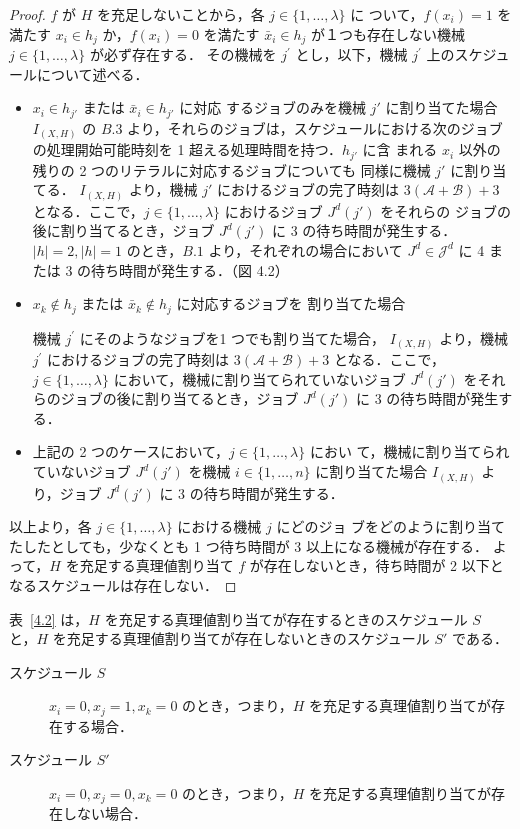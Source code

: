 \documentclass[12pt]{optlab-bachelor}
\begin{document}
\begin{proof}
  $f$ が $H$ を充足しないことから，各 $j \in \{1, \ldots, \lambda \}$ に
  ついて，$f(x_i) = 1$ を満たす $x_i \in h_j$ か，$f(x_i) = 0$ を満たす
  $\bar x_i \in h_j$ が１つも存在しない機械 $j \in \{1,\ldots, \lambda\}$ が必ず存在する．
  その機械を $j^{\prime}$ とし，以下，機械 $j^{\prime}$ 上のスケジュールについて述べる．
  \begin{itemize}
    \item $x_i \in h_{j'}$ または $\bar x_i \in h_{j'}$ に対応
    するジョブのみを機械 $j'$ に割り当てた場合
    $I_{(X,H)}$ の $B.3$ より，それらのジョブは，スケジュールにおける次のジョブの処理開始可能時刻を 1 超える処理時間を持つ．$h_{j'}$ に含
    まれる $x_i$ 以外の残りの 2 つのリテラルに対応するジョブについても
    同様に機械 $j'$ に割り当てる．
    $I_{(X,H)}$ より，機械 $j'$ におけるジョブの完了時刻は
    $3(\mathcal{A} + \mathcal{B}) + 3$ となる．ここで，$j \in
    \{1,\ldots,\lambda\}$ におけるジョブ $J^d(j')$ をそれらの
    ジョブの後に割り当てるとき，ジョブ $J^d(j')$ に 3 の待ち時間が発生する．$|h| = 2,|h| = 1$ のとき，$B.1$ より，それぞれの場合において $J^d \in \mathcal{J}^d$ に 4 または 3 の待ち時間が発生する．（図 4.2）
  \end{itemize}

  \begin{itemize}
    \item $x_k \notin h_j$ または $\bar x_k \notin h_j$ に対応するジョブを
    割り当てた場合

    機械 $j^{\prime}$ にそのようなジョブを1 つでも割り当てた場合，
    $I_{(X,H)}$ より，機械 $j^{\prime}$ におけるジョブの完了時刻は
    $3(\mathcal{A} + \mathcal{B}) + 3$ となる．ここで，$j \in
    \{1,\ldots,\lambda\}$ において，機械に割り当てられていないジョブ
    $J^d(j')$ をそれらのジョブの後に割り当てるとき，ジョブ
    $J^d(j')$ に 3 の待ち時間が発生する．
    \item 上記の 2 つのケースにおいて，$j \in \{1,\ldots,\lambda\}$ におい
    て，機械に割り当てられていないジョブ $J^d(j')$ を機械 $i
    \in \{1,\ldots,n\}$ に割り当てた場合 $I_{(X,H)}$ より，ジョブ
    $J^d(j')$ に 3 の待ち時間が発生する．
  \end{itemize}
  以上より，各 $j \in \{1,\ldots,\lambda\}$ における機械 $j$ にどのジョ
  ブをどのように割り当てたしたとしても，少なくとも 1 つ待ち時間が 3 以上になる機械が存在する．
  よって，$H$ を充足する真理値割り当て $f$ が存在しないとき，待ち時間が 2 以下となるスケジュールは存在しない．
\end{proof}
表~\ref{4.2} は，$H$ を充足する真理値割り当てが存在するときのスケジュール $S$ と，$H$ を充足する真理値割り当てが存在しないときのスケジュール $S'$ である．
\begin{description}
  \item[スケジュール $S$ ] $x_i = 0, x_j = 1, x_k = 0$ のとき，つまり，$H$ を充足する真理値割り当てが存在する場合．
  \item[スケジュール $S'$ ] $x_i = 0, x_j = 0, x_k = 0$ のとき，つまり，$H$ を充足する真理値割り当てが存在しない場合．
\end{description}
\end{document}
